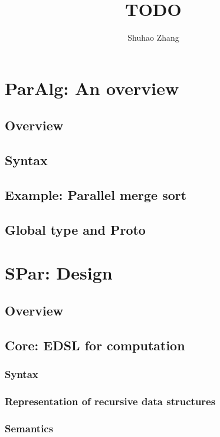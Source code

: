 \documentclass[a4paper, twoside]{report}
\title{TODO}
\author{Shuhao Zhang}
\begin{document}




\tableofcontents



% 
% 
\chapter{ParAlg: An overview}
\section{Overview}
\section{Syntax}
\section{Example: Parallel merge sort}
\section{Global type and Proto}
\chapter{SPar: Design}
\section{Overview}
\section{Core: EDSL for computation}
\subsection{Syntax}
\subsection{Representation of recursive data structures}
\subsection{Semantics}
\end{document}
